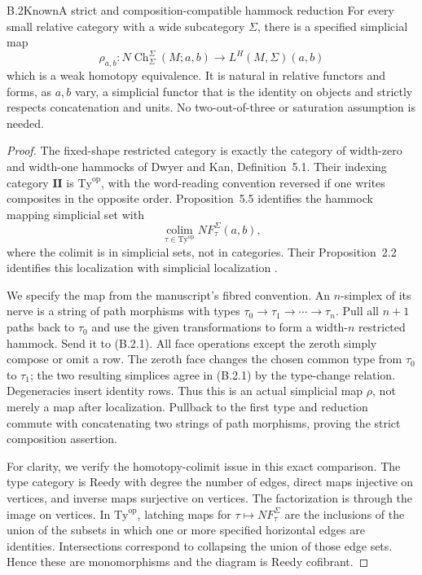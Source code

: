 \begin{result}{B.2}{Known}{A strict and composition-compatible hammock reduction}
For every small relative category with a wide subcategory $\Sigma$, there is a specified simplicial map
\[
 \rho_{a,b}:N\operatorname{Ch}_\Sigma^\Sigma(M;a,b)
       \longrightarrow L^H(M,\Sigma)(a,b)
\]
which is a weak homotopy equivalence. It is natural in relative functors and forms, as $a,b$ vary, a simplicial functor that is the identity on objects and strictly respects concatenation and units. No two-out-of-three or saturation assumption is needed.
\end{result}
\begin{proof}
The fixed-shape restricted category is exactly the category of width-zero and width-one hammocks of Dwyer and Kan, Definition~5.1. Their indexing category $\mathbf {II}$ is $\mathrm{Ty}^{\mathrm{op}}$, with the word-reading convention reversed if one writes composites in the opposite order. Proposition~5.5 identifies the hammock mapping simplicial set with
\[
 \operatorname*{colim}_{\tau\in\mathrm{Ty}^{\mathrm{op}}}
             N F_\tau^\Sigma(a,b),                         \tag{B.2.1}
\]
where the colimit is in simplicial sets, not in categories. Their Proposition~2.2 identifies this localization with simplicial localization \citep{DwyerKan1980Calculating}.

We specify the map from the manuscript's fibred convention. An $n$-simplex of its nerve is a string of path morphisms with types
$\tau_0\to\tau_1\to\cdots\to\tau_n$. Pull all $n+1$ paths back to $\tau_0$ and use the given transformations to form a width-$n$ restricted hammock. Send it to (B.2.1). All face operations except the zeroth simply compose or omit a row. The zeroth face changes the chosen common type from $\tau_0$ to $\tau_1$; the two resulting simplices agree in (B.2.1) by the type-change relation. Degeneracies insert identity rows. Thus this is an actual simplicial map $\rho$, not merely a map after localization. Pullback to the first type and reduction commute with concatenating two strings of path morphisms, proving the strict composition assertion.

For clarity, we verify the homotopy-colimit issue in this exact comparison. The type category is Reedy with degree the number of edges, direct maps injective on vertices, and inverse maps surjective on vertices. The factorization is through the image on vertices. In $\mathrm{Ty}^{\mathrm{op}}$, latching maps for $\tau\mapsto NF_\tau^\Sigma$ are the inclusions of the union of the subsets in which one or more specified horizontal edges are identities. Intersections correspond to collapsing the union of those edge sets. Hence these are monomorphisms and the diagram is Reedy cofibrant.


\end{proof}
